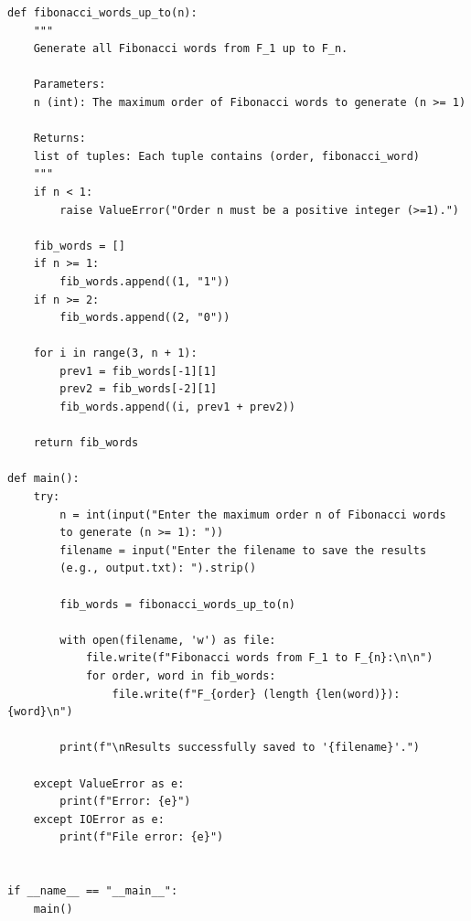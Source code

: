 \documentclass[12pt, a4paper]{article}
\begin{document}
\begin{verbatim}
def fibonacci_words_up_to(n):
    """
    Generate all Fibonacci words from F_1 up to F_n.

    Parameters:
    n (int): The maximum order of Fibonacci words to generate (n >= 1)

    Returns:
    list of tuples: Each tuple contains (order, fibonacci_word)
    """
    if n < 1:
        raise ValueError("Order n must be a positive integer (>=1).")

    fib_words = []
    if n >= 1:
        fib_words.append((1, "1"))
    if n >= 2:
        fib_words.append((2, "0"))

    for i in range(3, n + 1):
        prev1 = fib_words[-1][1]
        prev2 = fib_words[-2][1]
        fib_words.append((i, prev1 + prev2))

    return fib_words

def main():
    try:
        n = int(input("Enter the maximum order n of Fibonacci words 
        to generate (n >= 1): "))
        filename = input("Enter the filename to save the results
        (e.g., output.txt): ").strip()

        fib_words = fibonacci_words_up_to(n)

        with open(filename, 'w') as file:
            file.write(f"Fibonacci words from F_1 to F_{n}:\n\n")
            for order, word in fib_words:
                file.write(f"F_{order} (length {len(word)}): {word}\n")

        print(f"\nResults successfully saved to '{filename}'.")

    except ValueError as e:
        print(f"Error: {e}")
    except IOError as e:
        print(f"File error: {e}")


if __name__ == "__main__":
    main()
\end{verbatim}







\end{document}
